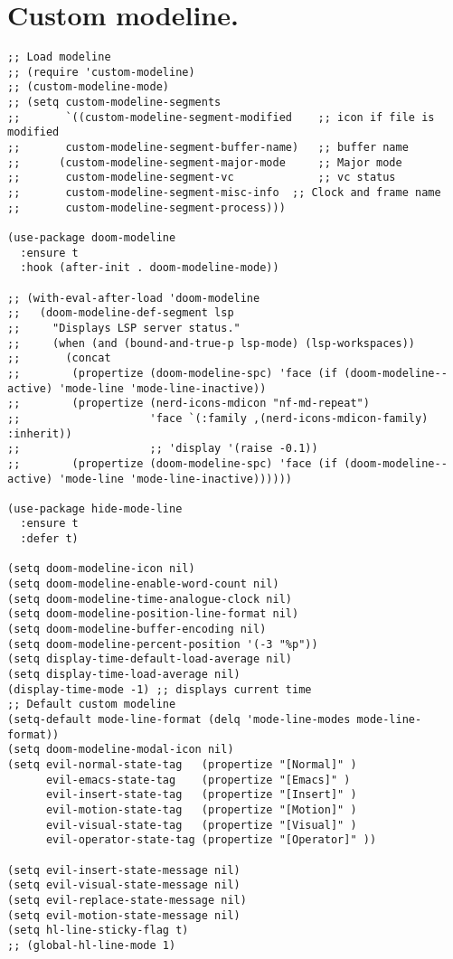 \documentclass[11pt]{article}
\begin{document}
\section{Custom modeline.}
\label{sec:org75b348e}
\begin{verbatim}
;; Load modeline
;; (require 'custom-modeline)
;; (custom-modeline-mode)
;; (setq custom-modeline-segments
;;       `((custom-modeline-segment-modified	;; icon if file is modified 
;; 		 custom-modeline-segment-buffer-name)	;; buffer name
;; 		(custom-modeline-segment-major-mode 	;; Major mode
;; 		 custom-modeline-segment-vc 			;; vc status
;; 		 custom-modeline-segment-misc-info 	;; Clock and frame name
;; 		 custom-modeline-segment-process)))

(use-package doom-modeline
  :ensure t
  :hook (after-init . doom-modeline-mode))

;; (with-eval-after-load 'doom-modeline
;;   (doom-modeline-def-segment lsp
;;     "Displays LSP server status."
;;     (when (and (bound-and-true-p lsp-mode) (lsp-workspaces))
;;       (concat
;;        (propertize (doom-modeline-spc) 'face (if (doom-modeline--active) 'mode-line 'mode-line-inactive))
;;        (propertize (nerd-icons-mdicon "nf-md-repeat")
;;                    'face `(:family ,(nerd-icons-mdicon-family) :inherit))
;;                    ;; 'display '(raise -0.1))
;;        (propertize (doom-modeline-spc) 'face (if (doom-modeline--active) 'mode-line 'mode-line-inactive))))))

(use-package hide-mode-line
  :ensure t
  :defer t)

(setq doom-modeline-icon nil)
(setq doom-modeline-enable-word-count nil)
(setq doom-modeline-time-analogue-clock nil)
(setq doom-modeline-position-line-format nil)
(setq doom-modeline-buffer-encoding nil)
(setq doom-modeline-percent-position '(-3 "%p"))
(setq display-time-default-load-average nil)
(setq display-time-load-average nil)
(display-time-mode -1) ;; displays current time
;; Default custom modeline
(setq-default mode-line-format (delq 'mode-line-modes mode-line-format))
(setq doom-modeline-modal-icon nil)
(setq evil-normal-state-tag   (propertize "[Normal]" )
      evil-emacs-state-tag    (propertize "[Emacs]" )
      evil-insert-state-tag   (propertize "[Insert]" )
      evil-motion-state-tag   (propertize "[Motion]" )
      evil-visual-state-tag   (propertize "[Visual]" )
      evil-operator-state-tag (propertize "[Operator]" ))

(setq evil-insert-state-message nil)
(setq evil-visual-state-message nil)
(setq evil-replace-state-message nil)
(setq evil-motion-state-message nil)
(setq hl-line-sticky-flag t)
;; (global-hl-line-mode 1)


\end{verbatim}
\end{document}
